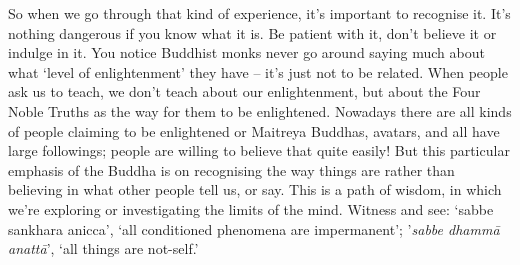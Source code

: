 So when we go through that kind of experience, it's important to recognise it. It's nothing dangerous if you know what it is. Be patient with it, don't believe it or indulge in it. You notice Buddhist monks never go around saying much about what `level of enlightenment' they have -- it's just not to be related. When people ask us to teach, we don't teach about our enlightenment, but about the Four Noble Truths as the way for them to be enlightened. Nowadays there are all kinds of people claiming to be enlightened or Maitreya Buddhas, avatars, and all have large followings; people are willing to believe that quite easily! But this particular emphasis of the Buddha is on recognising the way things are rather than believing in what other people tell us, or say. This is a path of wisdom, in which we're exploring or investigating the limits of the mind. Witness and see: `sabbe sankhara anicca', `all conditioned phenomena are impermanent'; '\textit{sabbe dhamm\=a anatt\=a}', `all things are not-self.' 


